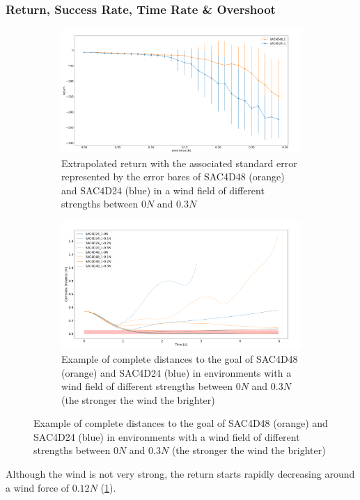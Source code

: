 \subsubsection*{Return, Success Rate, Time Rate \& Overshoot}
\begin{figure} 
	\begin{subfigure}{0.49\linewidth}
		\includegraphics[width=\linewidth]{figures/windreward.png}
	\caption{Extrapolated return with the associated standard error represented by the error bares 
	of SAC4D48 (orange) and SAC4D24 (blue) in a wind field of different strengths between $0N$ and $0.3N$}
	\label{fig:return}
	\end{subfigure}
	\hfill
	\begin{subfigure}{0.49\linewidth}
		\includegraphics[width=\linewidth]{figures/winddistances.png}
	\caption{Example of complete distances to the goal of SAC4D48 (orange)
	and SAC4D24 (blue) in environments with a wind field of different strengths
	between $0N$ and $0.3N$ (the stronger the wind the brighter)}
	\label{fig:winddist}
	\end{subfigure}
\end{figure}
Although the wind is not very strong, the return starts rapidly decreasing around a wind force of $0.12N$ (\cref{fig:return}).
